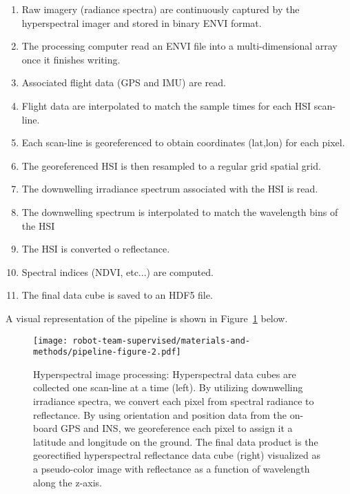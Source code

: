 \begin{enumerate}
\item Raw imagery (radiance spectra) are continuously captured by the hyperspectral imager and stored in binary ENVI format.
\item The processing computer read an ENVI file into a multi-dimensional array
  once it finishes writing.
\item Associated flight data (GPS and IMU) are read.
\item Flight data are interpolated to match the sample times for each HSI scan-line.
\item Each scan-line is georeferenced to obtain coordinates (lat,lon) for each pixel.
\item The georeferenced HSI is then resampled to a regular grid spatial grid.
\item The downwelling irradiance spectrum associated with the HSI is read.
\item The downwelling spectrum is interpolated to match the wavelength bins of the HSI
\item The HSI is converted o reflectance.
\item Spectral indices (NDVI, etc...) are computed.
\item The final data cube is saved to an HDF5 file.
\end{enumerate}
A visual representation of the pipeline is shown in
Figure~\ref{fig:hsi-pipeline} below.
\begin{figure}[H]
  \centering
  \texttt{[image: robot-team-supervised/materials-and-methods/pipeline-figure-2.pdf]}
  \caption{Hyperspectral image processing: Hyperspectral data cubes are
    collected one scan-line at a time (left). By utilizing downwelling
    irradiance spectra, we convert each pixel from spectral radiance to
    reflectance. By using orientation and position data from the on-board GPS
    and INS, we georeference each pixel to assign it a latitude and longitude on
    the ground. The final data product is the georectified hyperspectral
    reflectance data cube (right) visualized as a pseudo-color image with
    reflectance  as a function of wavelength along the
    z-axis.\label{fig:hsi-pipeline}}
\end{figure}




